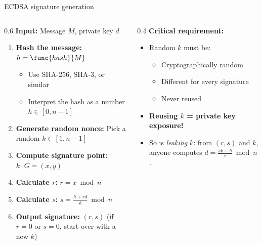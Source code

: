 \ifdefined\PRESENTATION\else\PassOptionsToClass{handout}{beamer}\fi\documentclass[aspectratio=169, lualatex]{beamer}
\begin{document}
\begin{frame}{ECDSA signature generation}
	\begin{columns}
		\begin{column}{0.6\textwidth}
			\textbf{Input:} Message $M$, private key $d$
			\begin{enumerate}
				\item \textbf{Hash the message:} $h = \func{hash}{M}$
				      \begin{itemize}
					      \item Use SHA-256, SHA-3, or similar
					      \item Interpret the hash as a number $h \in [0, n-1]$
				      \end{itemize}
				\item \textbf{Generate random nonce:} Pick a random $k \in [1, n-1]$
				\item \textbf{Compute signature point:} $k \cdot G = (x, y)$
				\item \textbf{Calculate $r$:} $r = x \bmod n$
				\item \textbf{Calculate $s$:} $s = \frac{h + rd}{k} \bmod n$
				\item \textbf{Output signature:} $(r, s)$ \quad (if $r = 0$ or $s = 0$, start over with a new $k$)
			\end{enumerate}
		\end{column}
		\begin{column}{0.4\textwidth}
			\textbf{Critical requirement:}
			\begin{itemize}
				\item Random $k$ must be:
				      \begin{itemize}
					      \item Cryptographically random
					      \item Different for every signature
					      \item Never reused
				      \end{itemize}
				\item \textbf{Reusing $k$ = private key exposure!}
				\item So is \emph{leaking} $k$: from $(r, s)$ and $k$, anyone computes $d = \frac{sk - h}{r} \bmod n$.
			\end{itemize}
		\end{column}
	\end{columns}
\end{frame}
\end{document}
